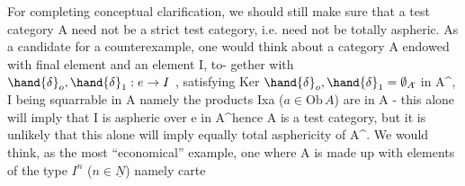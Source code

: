 For completing conceptual clarification,  we should still make sure
that a test category A need not be a strict test category,  i.e. need
not be totally aspheric.  As a candidate for a counterexample,  one would
think about a category A endowed with final element and an element I,  to-%
gether with $\hand{\delta}_o,\hand{\delta}_1 : e\to I$ ,   satisfying Ker $\hand{\delta}_o,\hand{\delta}_1 = \emptyset_{A\hat{}}$
in A\^{}, I being squarrable in A namely the products Ixa ($a\in \mathrm{Ob}\,A$) are in A
-  this alone will imply that I is aspheric over e in A\^{}\hand{,}hence A is a test
category,  but it is unlikely that this alone will imply equally total 
asphericity of A\^{}.  We would think,  as the most ``economical'' example,
one where A is made up with elements of the type  $I^n$  ($n\in\underline{N}$)  namely carte
